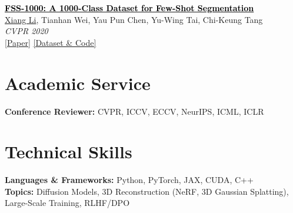 \documentclass[11pt,letterpaper]{article}
\newcommand{\papertitle}[2]{\href{#1}{\textcolor{black}{\textbf{#2}}}}
\begin{document}
\begin{enumerate}[leftmargin=*, label={[\arabic*]}]
    \item \papertitle{https://openaccess.thecvf.com/content_CVPR_2020/papers/Li_FSS-1000_A_1000-Class_Dataset_for_Few-Shot_Segmentation_CVPR_2020_paper.pdf}{FSS-1000: A 1000-Class Dataset for Few-Shot Segmentation} \\
    \underline{Xiang Li}, Tianhan Wei, Yau Pun Chen, Yu-Wing Tai, Chi-Keung Tang \\
    \textit{CVPR 2020} \\
    {\small \href{https://openaccess.thecvf.com/content_CVPR_2020/papers/Li_FSS-1000_A_1000-Class_Dataset_for_Few-Shot_Segmentation_CVPR_2020_paper.pdf}{[Paper]} \href{https://github.com/HKUSTCV/FSS-1000}{[Dataset \& Code]}}

\end{enumerate}

\section{Academic Service}

\textbf{Conference Reviewer:} CVPR, ICCV, ECCV, NeurIPS, ICML, ICLR

\section{Technical Skills}

\textbf{Languages \& Frameworks:} Python, PyTorch, JAX, CUDA, C++ \\
\textbf{Topics:} Diffusion Models, 3D Reconstruction (NeRF, 3D Gaussian Splatting), Large-Scale Training, RLHF/DPO
\end{document}
